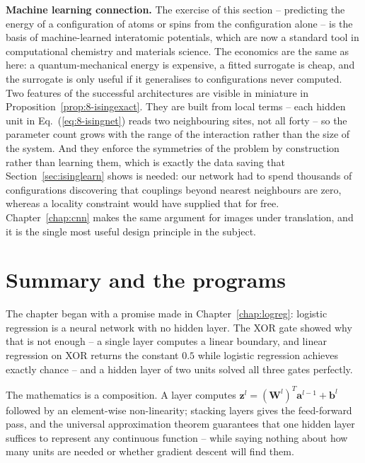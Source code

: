 \begin{notebox}
\textbf{Machine learning connection.}  The exercise of this section --
predicting the energy of a configuration of atoms or spins from the
configuration alone -- is the basis of machine-learned interatomic potentials,
which are now a standard tool in computational chemistry and materials
science.  The economics are the same as here: a quantum-mechanical energy is
expensive, a fitted surrogate is cheap, and the surrogate is only useful if it
generalises to configurations never computed.  Two features of the successful
architectures are visible in miniature in
Proposition~\ref{prop:8-isingexact}.  They are built from local terms -- each
hidden unit in Eq.~(\ref{eq:8-isingnet}) reads two neighbouring sites, not all
forty -- so the parameter count grows with the range of the interaction rather
than the size of the system.  And they enforce the symmetries of the problem
by construction rather than learning them, which is exactly the data saving
that Section~\ref{sec:isinglearn} shows is needed: our network had to spend
thousands of configurations discovering that couplings beyond nearest
neighbours are zero, whereas a locality constraint would have supplied that
for free.  Chapter~\ref{chap:cnn} makes the same argument for images under
translation, and it is the single most useful design principle in the
subject.
\end{notebox}

\section{Summary and the programs}
\label{sec:ch8summary}

The chapter began with a promise made in Chapter~\ref{chap:logreg}: logistic
regression is a neural network with no hidden layer.  The XOR gate showed why
that is not enough -- a single layer computes a linear boundary, and linear
regression on XOR returns the constant $0.5$ while logistic regression achieves
exactly chance -- and a hidden layer of two units solved all three gates
perfectly.

The mathematics is a composition.  A layer computes
$\bm{z}^{l}=(\bm{W}^{l})^{T}\bm{a}^{l-1}+\bm{b}^{l}$ followed by an
element-wise non-linearity; stacking layers gives the feed-forward pass, and
the universal approximation theorem guarantees that one hidden layer suffices
to represent any continuous function -- while saying nothing about how many
units are needed or whether gradient descent will find them.

